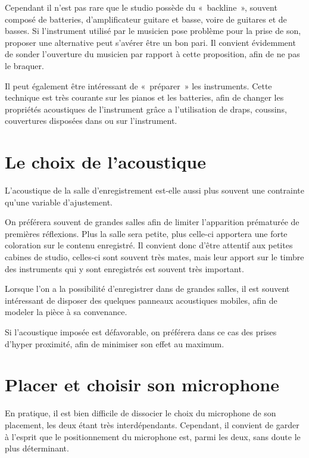 \documentclass[
]{book}
\begin{document}
Cependant il n'est pas rare que le studio possède du «~backline~», souvent composé de batteries, d'amplificateur guitare et basse, voire de guitares et de basses. Si l'instrument utilisé par le musicien pose problème pour la prise de son, proposer une alternative peut s'avérer être un bon pari. Il convient évidemment de sonder l'ouverture du musicien par rapport à cette proposition, afin de ne pas le braquer.

Il peut également être intéressant de «~préparer~» les instruments. Cette technique est très courante sur les pianos et les batteries, afin de changer les propriétés acoustiques de l'instrument grâce a l'utilisation de draps, coussins, couvertures disposées dans ou sur l'instrument.

\hypertarget{le-choix-de-lacoustique}{%
\section{Le choix de l'acoustique}\label{le-choix-de-lacoustique}}

L'acoustique de la salle d'enregistrement est-elle aussi plus souvent une contrainte qu'une variable d'ajustement.

On préférera souvent de grandes salles afin de limiter l'apparition prématurée de premières réflexions. Plus la salle sera petite, plus celle-ci apportera une forte coloration sur le contenu enregistré. Il convient donc d'être attentif aux petites cabines de studio, celles-ci sont souvent très mates, mais leur apport sur le timbre des instruments qui y sont enregistrés est souvent très important.

Lorsque l'on a la possibilité d'enregistrer dans de grandes salles, il est souvent intéressant de disposer des quelques panneaux acoustiques mobiles, afin de modeler la pièce à sa convenance.

Si l'acoustique imposée est défavorable, on préférera dans ce cas des prises d'hyper proximité, afin de minimiser son effet au maximum.

\hypertarget{placer-et-choisir-son-microphone}{%
\section{Placer et choisir son microphone}\label{placer-et-choisir-son-microphone}}

En pratique, il est bien difficile de dissocier le choix du microphone de son placement, les deux étant très interdépendants. Cependant, il convient de garder à l'esprit que le positionnement du microphone est, parmi les deux, sans doute le plus déterminant.
\end{document}
